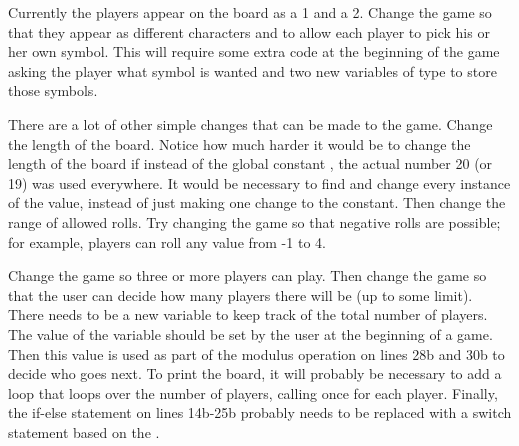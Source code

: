 Currently the players appear on the board as a 1 and a 2.  Change the game so that they appear as different characters and to allow each player to pick his or her own symbol.  This will require some extra code at the beginning of the game asking the player what symbol is wanted and two new variables of type  to store those symbols.

There are a lot of other simple changes that can be made to the game.  Change the length of the board.   Notice how much harder it would be to change the length of the board if instead of the global constant , the actual number 20 (or 19) was used everywhere.  It would be necessary to find and change every instance of the value, instead of just making one change to the constant.  Then change the range of allowed rolls.  Try changing the game so that negative rolls are possible; for example, players can roll any value from -1 to 4. 

Change the game so three or more players can play.  Then change the game so that the user can decide how many players there will be (up to some limit).  There needs to be a new variable to keep track of the total number of players.  The value of the variable should be set by the user at the beginning of a game.  Then this value is used as part of the modulus operation on lines 28b and 30b to decide who goes next.  To print the board, it will probably be necessary to add a  loop that loops over the number of players, calling  once for each player.  Finally, the if-else statement on lines 14b-25b probably needs to be replaced with a switch statement based on the .

